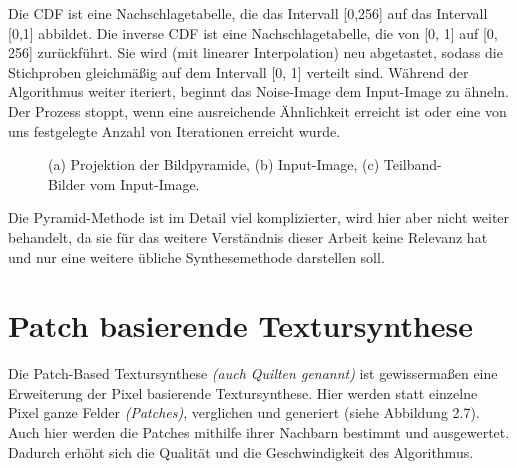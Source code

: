 \documentclass[12pt, a4paper,twoside,openright]{report} %
\begin{document}
Die CDF ist eine Nachschlagetabelle, die das Intervall {[0,256]} auf das Intervall {[0,1]} abbildet.
Die inverse CDF ist eine Nachschlagetabelle, die von {[0, 1]} auf {[0, 256]} zurückführt.
Sie wird {(mit linearer Interpolation)} neu abgetastet,
sodass die Stichproben gleichmäßig auf dem Intervall {[0, 1]} verteilt sind. \cite{Heeger}
\newline
Während der Algorithmus weiter iteriert, beginnt das Noise-Image dem Input-Image zu ähneln.
Der Prozess stoppt, wenn eine ausreichende Ähnlichkeit erreicht ist oder eine von uns festgelegte Anzahl von Iterationen erreicht wurde.

\begin{figure}[H]
    \centering
    \qquad
    \qquad
    \caption{(a) Projektion der Bildpyramide, (b) Input-Image, (c) Teilband-Bilder vom Input-Image.}%
\end{figure}

Die Pyramid-Methode ist im Detail viel komplizierter,
wird hier aber nicht weiter behandelt, da sie für das weitere Verständnis dieser Arbeit keine Relevanz hat und nur eine weitere übliche Synthesemethode darstellen soll.

\section{Patch basierende Textursynthese}

Die Patch-Based Textursynthese \textit{(auch Quilten genannt)} ist gewissermaßen eine Erweiterung der Pixel basierende Textursynthese.
Hier werden statt einzelne Pixel ganze Felder \textit{(Patches)}, verglichen und generiert {(siehe Abbildung 2.7)}.
Auch hier werden die Patches mithilfe ihrer Nachbarn bestimmt und ausgewertet.
Dadurch erhöht sich die Qualität und die Geschwindigkeit des Algorithmus.
\end{document}
